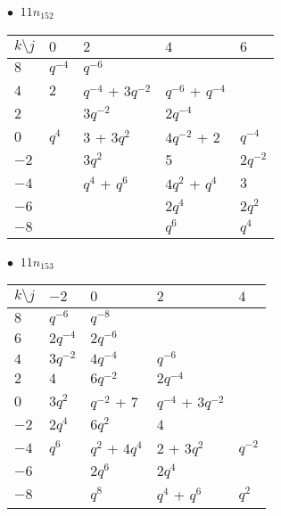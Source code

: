 \begin{minipage}{\linewidth}
$\bullet\ $ $11n_{152}$ \vspace{0.5em} \\
\begin{tabular}{l|llll}
$k \setminus j$ & $0$ & $2$ & $4$ & $6$ \\
\hline
$8$ & $q^{-4}$ & $q^{-6}$ &  &  \\
$4$ & $2$ & $q^{-4}$ + $3q^{-2}$ & $q^{-6}$ + $q^{-4}$ &  \\
$2$ &  & $3q^{-2}$ & $2q^{-4}$ &  \\
$0$ & $q^{4}$ & $3$ + $3q^{2}$ & $4q^{-2}$ + $2$ & $q^{-4}$ \\
$-2$ &  & $3q^{2}$ & $5$ & $2q^{-2}$ \\
$-4$ &  & $q^{4}$ + $q^{6}$ & $4q^{2}$ + $q^{4}$ & $3$ \\
$-6$ &  &  & $2q^{4}$ & $2q^{2}$ \\
$-8$ &  &  & $q^{6}$ & $q^{4}$ \\
\end{tabular}
\vspace{2em}
\end{minipage}
%
\begin{minipage}{\linewidth}
$\bullet\ $ $11n_{153}$ \vspace{0.5em} \\
\begin{tabular}{l|llll}
$k \setminus j$ & $-2$ & $0$ & $2$ & $4$ \\
\hline
$8$ & $q^{-6}$ & $q^{-8}$ &  &  \\
$6$ & $2q^{-4}$ & $2q^{-6}$ &  &  \\
$4$ & $3q^{-2}$ & $4q^{-4}$ & $q^{-6}$ &  \\
$2$ & $4$ & $6q^{-2}$ & $2q^{-4}$ &  \\
$0$ & $3q^{2}$ & $q^{-2}$ + $7$ & $q^{-4}$ + $3q^{-2}$ &  \\
$-2$ & $2q^{4}$ & $6q^{2}$ & $4$ &  \\
$-4$ & $q^{6}$ & $q^{2}$ + $4q^{4}$ & $2$ + $3q^{2}$ & $q^{-2}$ \\
$-6$ &  & $2q^{6}$ & $2q^{4}$ &  \\
$-8$ &  & $q^{8}$ & $q^{4}$ + $q^{6}$ & $q^{2}$ \\
\end{tabular}
\vspace{2em}
\end{minipage}
%
